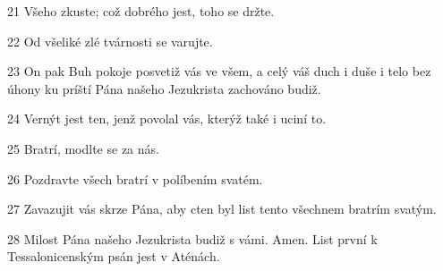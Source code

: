 \par 21 Všeho zkuste; což dobrého jest, toho se držte.
\par 22 Od všeliké zlé tvárnosti se varujte.
\par 23 On pak Buh pokoje posvetiž vás ve všem, a celý váš duch i duše i telo bez úhony ku príští Pána našeho Jezukrista zachováno budiž.
\par 24 Vernýt jest ten, jenž povolal vás, kterýž také i uciní to.
\par 25 Bratrí, modlte se za nás.
\par 26 Pozdravte všech bratrí v políbením svatém.
\par 27 Zavazujit vás skrze Pána, aby cten byl list tento všechnem bratrím svatým.
\par 28 Milost Pána našeho Jezukrista budiž s vámi. Amen. List první k Tessalonicenským psán jest v Aténách.


